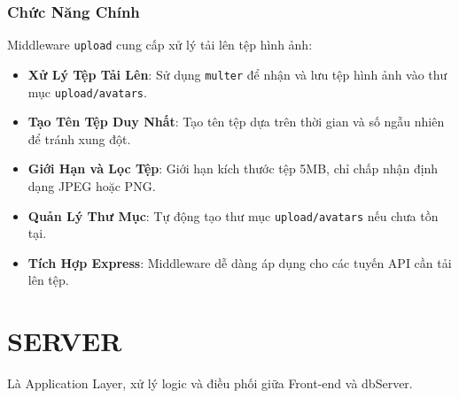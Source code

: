             \subsubsection{Chức Năng Chính}
                \hspace*{0.6cm}Middleware \texttt{upload} cung cấp xử lý tải lên tệp hình ảnh:
                \begin{itemize}
                    \item \textbf{Xử Lý Tệp Tải Lên}: Sử dụng \texttt{multer} để nhận và lưu tệp hình ảnh vào thư mục \texttt{upload/avatars}.
                    \item \textbf{Tạo Tên Tệp Duy Nhất}: Tạo tên tệp dựa trên thời gian và số ngẫu nhiên để tránh xung đột.
                    \item \textbf{Giới Hạn và Lọc Tệp}: Giới hạn kích thước tệp 5MB, chỉ chấp nhận định dạng JPEG hoặc PNG.
                    \item \textbf{Quản Lý Thư Mục}: Tự động tạo thư mục \texttt{upload/avatars} nếu chưa tồn tại.
                    \item \textbf{Tích Hợp Express}: Middleware dễ dàng áp dụng cho các tuyến API cần tải lên tệp.
                \end{itemize}
    \section{SERVER}
        \hspace*{0.6cm}Là Application Layer, xử lý logic và điều phối giữa Front-end và dbServer.
